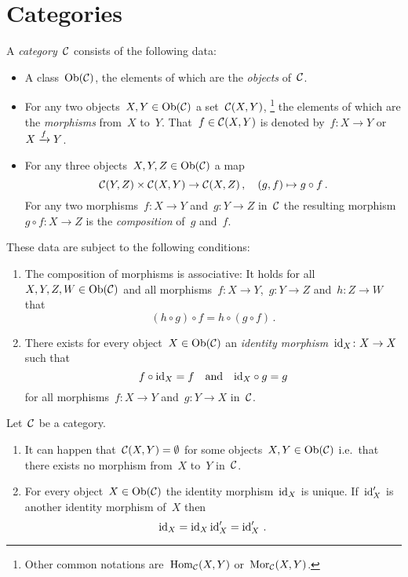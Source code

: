 \section{Categories}

\begin{definition}
  A \emph{category}~$\mathcal{C}$ consists of the following data:
  \begin{itemize}
    \item
      A class~$\operatorname{Ob}(\mathcal{C})$, the elements of which are the \emph{objects} of~$\mathcal{C}$.
    \item
      For any two objects~$X, Y \in \operatorname{Ob}(\mathcal{C})$ a set~$\mathcal{C}(X,Y)$,%
      \footnote{Other common notations are~$\operatorname{Hom}_{\mathcal{C}}(X,Y)$ or~$\operatorname{Mor}_{\mathcal{C}}(X,Y)$.}
      the elements of which are the \emph{morphisms} from~$X$ to~$Y$.
      That~$f \in \mathcal{C}(X,Y)$ is denoted by~$f \colon X \to Y$ or~$X \xrightarrow{f} Y$.
    \item
      For any three objects~$X, Y, Z \in \operatorname{Ob}(\mathcal{C})$ a map
      \[
                \mathcal{C}(Y,Z) \times \mathcal{C}(X,Y)
        \to     \mathcal{C}(X,Z) \,,
        \quad   (g, f)
        \mapsto g \circ f \,.
      \]
      For any two morphisms~$f \colon X \to Y$ and~$g \colon Y \to Z$ in~$\mathcal{C}$ the resulting morphism~$g \circ f \colon X \to Z$ is the \emph{composition} of~$g$ and~$f$.
  \end{itemize}
  These data are subject to the following conditions:
  \begin{enumerate}[label=(C\arabic*)]
    \item
      The composition of morphisms is associative:
      It holds for all~$X, Y, Z, W \in \operatorname{Ob}(\mathcal{C})$ and all morphisms~$f \colon X \to Y$,~$g \colon Y \to Z$ and~$h \colon Z \to W$ that
      \[
          (h \circ g) \circ f
        = h \circ (g \circ f) \,.
      \]
    \item
      There exists for every object~$X \in \operatorname{Ob}(\mathcal{C})$ an \emph{identity morphism}~$\operatorname{id}_X \colon X \to X$ such that
      \[
        f \circ {\operatorname{id}_X} = f
        \quad\text{and}\quad
        {\operatorname{id}_X} \circ g = g
      \]
      for all morphisms~$f \colon X \to Y$ and~$g \colon Y \to X$ in~$\mathcal{C}$.
  \end{enumerate}
\end{definition}


\begin{remark}
  Let~$\mathcal{C}$ be a category.
  \begin{enumerate}
    \item
      It can happen that~$\mathcal{C}(X,Y) = \emptyset$ for some objects~$X, Y \in \operatorname{Ob}(\mathcal{C})$ i.e.\ that there exists no morphism from~$X$ to~$Y$ in~$\mathcal{C}$.
    \item
      For every object~$X \in \operatorname{Ob}(\mathcal{C})$ the identity morphism~$\operatorname{id}_X$ is unique.
      If~$\operatorname{id}'_X$ is another identity morphism of~$X$ then
      \[
          \operatorname{id}_X
        = \operatorname{id}_X \operatorname{id}'_X
        = \operatorname{id}'_X \,.
      \]
  \end{enumerate}
\end{remark}


